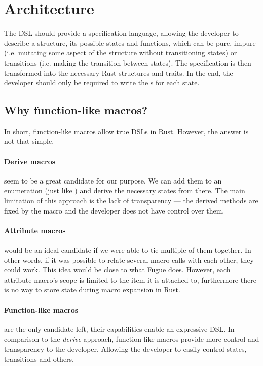 \section{Architecture}\label{sec:arch}

The DSL should provide a specification language,
allowing the developer to describe a structure, its possible states and functions,
which can be pure, impure (i.e. mutating some aspect of the structure without transitioning states)
or transitions (i.e. making the transition between states).
The specification is then transformed into the necessary Rust structures and traits.
In the end, the developer should only be required to write the s for each state.

\subsection{Why function-like macros?}

In short, function-like macros allow true DSLs in Rust. However, the answer is not that simple.

\paragraph{Derive macros} seem to be a great candidate for our purpose.
We can add them to an enumeration (just like \autocite{Fitzgerald2019}) and derive the necessary states from there.
The main limitation of this approach is the lack of transparency —
the derived methods are fixed by the macro and the developer does not have control over them.

\paragraph{Attribute macros} would be an ideal candidate if we were able to tie multiple of them together.
In other words, if it was possible to relate several macro calls with each other, they could work.
This idea would be close to what Fugue \autocite{DeLine2004} does.
However, each attribute macro's scope is limited to the item it is attached to,
furthermore there is no way to store state during macro expansion in Rust.

\paragraph{Function-like macros} are the only candidate left, their capabilities enable an expressive DSL.
In comparison to the \emph{derive} approach, function-like macros provide more control and transparency to the developer.
Allowing the developer to easily control states, transitions and others.

